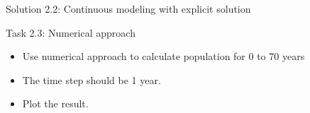 \begin{frame}[fragile]{Solution 2.2: Continuous modeling with explicit solution } 
\end{frame}




\begin{frame}{Task 2.3: Numerical approach }
    \begin{itemize}
        \item  Use numerical approach to calculate population for 0 to 70 years 
        \item The time step should be 1 year.
        \item  Plot the result.
    \end{itemize}
\end{frame}

